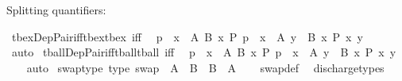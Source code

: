 \begin{isabellebody}
{\isafoldproof}%
%
\isadelimproof
%
\endisadelimproof
%
\begin{isamarkuptext}%
Splitting quantifiers:%
\end{isamarkuptext}\isamarkuptrue%
\isamarkupfalse%
\ tbex{\isacharunderscore}{\kern0pt}Dep{\isacharunderscore}{\kern0pt}Pair{\isacharunderscore}{\kern0pt}iff{\isacharunderscore}{\kern0pt}tbex{\isacharunderscore}{\kern0pt}tbex\ {\isacharbrackleft}{\kern0pt}iff{\isacharbrackright}{\kern0pt}{\isacharcolon}{\kern0pt}\isanewline
\ \ {\isachardoublequoteopen}{\isacharparenleft}{\kern0pt}{\isasymexists}p\ {\isacharcolon}{\kern0pt}\ {\isasymSum}x\ {\isacharcolon}{\kern0pt}\ A{\isachardot}{\kern0pt}\ {\isacharparenleft}{\kern0pt}B\ x{\isacharparenright}{\kern0pt}{\isachardot}{\kern0pt}\ P\ p{\isacharparenright}{\kern0pt}\ {\isasymlongleftrightarrow}\ {\isacharparenleft}{\kern0pt}{\isasymexists}x\ {\isacharcolon}{\kern0pt}\ A{\isachardot}{\kern0pt}\ {\isasymexists}y\ {\isacharcolon}{\kern0pt}\ B\ x{\isachardot}{\kern0pt}\ P\ {\isasymlangle}x{\isacharcomma}{\kern0pt}\ y{\isasymrangle}{\isacharparenright}{\kern0pt}{\isachardoublequoteclose}\isanewline
%
\isadelimproof
\ \ %
\endisadelimproof
%
\isatagproof
{}\isamarkupfalse%
\ auto%
\endisatagproof
{\isafoldproof}%
%
\isadelimproof
\isanewline
%
\endisadelimproof
\isanewline
{}\isamarkupfalse%
\ tball{\isacharunderscore}{\kern0pt}Dep{\isacharunderscore}{\kern0pt}Pair{\isacharunderscore}{\kern0pt}iff{\isacharunderscore}{\kern0pt}tball{\isacharunderscore}{\kern0pt}tball\ {\isacharbrackleft}{\kern0pt}iff{\isacharbrackright}{\kern0pt}{\isacharcolon}{\kern0pt}\isanewline
\ \ {\isachardoublequoteopen}{\isacharparenleft}{\kern0pt}{\isasymforall}p\ {\isacharcolon}{\kern0pt}\ {\isasymSum}x\ {\isacharcolon}{\kern0pt}\ A{\isachardot}{\kern0pt}\ {\isacharparenleft}{\kern0pt}B\ x{\isacharparenright}{\kern0pt}{\isachardot}{\kern0pt}\ P\ p{\isacharparenright}{\kern0pt}\ {\isasymlongleftrightarrow}\ {\isacharparenleft}{\kern0pt}{\isasymforall}x\ {\isacharcolon}{\kern0pt}\ A{\isachardot}{\kern0pt}\ {\isasymforall}y\ {\isacharcolon}{\kern0pt}\ B\ x{\isachardot}{\kern0pt}\ P\ {\isasymlangle}x{\isacharcomma}{\kern0pt}\ y{\isasymrangle}{\isacharparenright}{\kern0pt}{\isachardoublequoteclose}\isanewline
%
\isadelimproof
\ \ %
\endisadelimproof
%
\isatagproof
{}\isamarkupfalse%
\ auto%
\endisatagproof
{\isafoldproof}%
%
\isadelimproof
\isanewline
%
\endisadelimproof
\isanewline
{}\isamarkupfalse%
\ swap{\isacharunderscore}{\kern0pt}type\ {\isacharbrackleft}{\kern0pt}type{\isacharbrackright}{\kern0pt}{\isacharcolon}{\kern0pt}\ {\isachardoublequoteopen}swap\ {\isacharcolon}{\kern0pt}\ A\ {\isasymtimes}\ B\ {\isasymRightarrow}\ B\ {\isasymtimes}\ A{\isachardoublequoteclose}\isanewline
%
\isadelimproof
\ \ %
\endisadelimproof
%
\isatagproof
{}\isamarkupfalse%
\ swap{\isacharunderscore}{\kern0pt}def\ \isamarkupfalse%
\ discharge{\isacharunderscore}{\kern0pt}types%
\endisatagproof
{\isafoldproof}%
%
\isadelimproof
\isanewline
%
\endisadelimproof
\isanewline
%
\isadelimtheory
\isanewline
%
\endisadelimtheory
%
\isatagtheory
{}\isamarkupfalse%
%
\endisatagtheory
{\isafoldtheory}%
%
\isadelimtheory
%
\endisadelimtheory
%
\end{isabellebody}%
